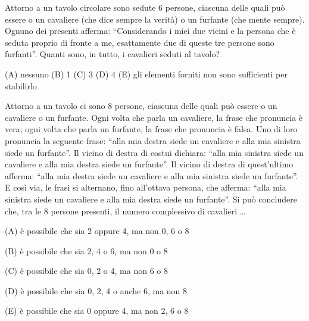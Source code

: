 \begin{esercizio}
    \label{ex:archimede_2017_triennio_4}
    Attorno a un tavolo circolare sono sedute 6 persone, ciascuna delle quali può
    essere o un cavaliere (che dice sempre la verità) o un furfante (che mente sempre).
    Ognuno dei presenti afferma: “Considerando i miei due vicini e la persona che
    è seduta proprio di fronte a me, esattamente due di queste tre persone sono
    furfanti”.
    Quanti sono, in tutto, i cavalieri seduti al tavolo?

    (A) nessuno \quad (B) 1 \quad (C) 3 \quad (D) 4 \quad
    (E) gli elementi forniti non sono sufficienti per stabilirlo
\end{esercizio}

\begin{esercizio}
    \label{ex:archimede_2019_biennio_15}
    Attorno a un tavolo ci sono 8 persone, ciascuna delle quali può essere o un cavaliere
    o un furfante.
    Ogni volta che parla un cavaliere, la frase che pronuncia è vera;
    ogni volta che parla un furfante, la frase che pronuncia è falsa.
    Uno di loro pronuncia la seguente frase:
    “alla mia destra siede un cavaliere e alla mia sinistra siede un furfante”.
    Il vicino di destra di costui dichiara: “alla mia sinistra siede un cavaliere e alla mia destra siede un furfante”.
    Il vicino di destra di quest'ultimo afferma:
    “alla mia destra siede un cavaliere e alla mia sinistra siede un furfante”.
    E così via, le frasi si alternano, fino all'ottava persona, che afferma:
    “alla mia sinistra siede un cavaliere e alla mia destra siede un furfante”.
    Si può concludere che, tra le 8 persone presenti, il numero complessivo di cavalieri \dots

    (A) è possibile che sia 2 oppure 4, ma non 0, 6 o 8

    (B) è possibile che sia 2, 4 o 6, ma non 0 o 8

    (C) è possibile che sia 0, 2 o 4, ma non 6 o 8

    (D) è possibile che sia 0, 2, 4 o anche 6, ma non 8

    (E) è possibile che sia 0 oppure 4, ma non 2, 6 o 8
\end{esercizio}


